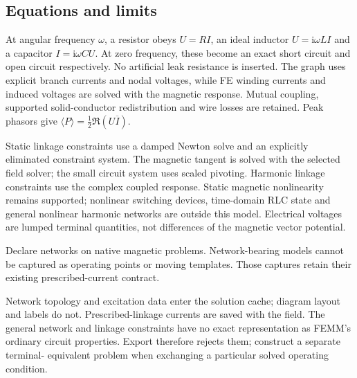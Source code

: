 \subsection{Equations and limits}
At angular frequency $\omega$, a resistor obeys $U=RI$, an ideal inductor
$U=\mathrm i\omega LI$ and a capacitor $I=\mathrm i\omega CU$. At zero frequency,
these become an exact short circuit and open circuit respectively. No artificial
leak resistance is inserted. The graph uses explicit branch currents and nodal
voltages, while FE winding currents and induced voltages are solved with the
magnetic response. Mutual coupling, supported solid-conductor redistribution and
wire losses are retained. Peak phasors give
$\langle P\rangle=\tfrac12\Re(U\overline I)$.

Static linkage constraints use a damped Newton solve and an explicitly eliminated
constraint system. The magnetic tangent is solved with the selected field solver;
the small circuit system uses scaled pivoting. Harmonic linkage constraints use
the complex coupled response. Static magnetic nonlinearity remains supported;
nonlinear switching devices, time-domain RLC state and general nonlinear harmonic
networks are outside this model. Electrical voltages are lumped terminal quantities,
not differences of the magnetic vector potential.

Declare networks on native magnetic problems. Network-bearing models cannot be
captured as operating points or moving templates. Those captures retain their
existing prescribed-current contract.

Network topology and excitation data enter the solution cache; diagram layout and
labels do not. Prescribed-linkage currents are saved with the field. The general
network and linkage constraints have no exact representation as FEMM's ordinary
circuit properties. Export therefore rejects them; construct a separate terminal-
equivalent problem when exchanging a particular solved operating condition.
